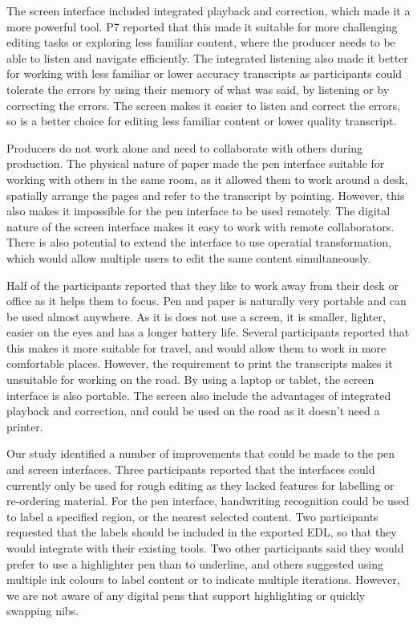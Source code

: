 The screen interface included integrated playback and correction, which made it a more powerful tool.  P7 reported that
this made it suitable for more challenging editing tasks or exploring less familiar content, where the producer needs
to be able to listen and navigate efficiently. The integrated listening also made it better for working with less
familiar or lower accuracy transcripts as participants could tolerate the errors by using their memory of what was
said, by listening or by correcting the errors. The screen makes it easier to listen and correct the errors, so is a
better choice for editing less familiar content or lower quality transcript. 

Producers do not work alone and need to collaborate with others during production. The physical nature of paper made
the pen interface suitable for working with others in the same room, as it allowed them to work around a desk,
spatially arrange the pages and refer to the transcript by pointing. However, this also makes it impossible for the pen
interface to be used remotely. The digital nature of the screen interface makes it easy to work with remote
collaborators. There is also potential to extend the interface to use operatial transformation, which would allow
multiple users to edit the same content simultaneously.

Half of the participants reported that they like to work away from their desk or office as it helps them to focus. Pen and
paper is naturally very portable and can be used almost anywhere. As it is does not use a screen, it is smaller,
lighter, easier on the eyes and has a longer battery life. Several participants reported that this makes it more
suitable for travel, and would allow them to work in more comfortable places. However, the requirement to print the
transcripts makes it unsuitable for working on the road. By using a laptop or tablet, the screen interface is also
portable. The screen also include the advantages of integrated playback and correction, and could be used on the road
as it doesn't need a printer.

Our study identified a number of improvements that could be made to the pen and screen interfaces. Three participants
reported that the interfaces could currently only be used for rough editing as they lacked features for labelling or
re-ordering material. For the pen interface, handwriting recognition could be used to label a specified region, or the
nearest selected content. Two participants requested that the labels should be included in the exported EDL, so that
they would integrate with their existing tools. Two other participants said they would prefer to use a highlighter pen
than to underline, and others suggested using multiple ink colours to label content or to indicate multiple iterations.
However, we are not aware of any digital pens that support highlighting or quickly swapping nibs.

